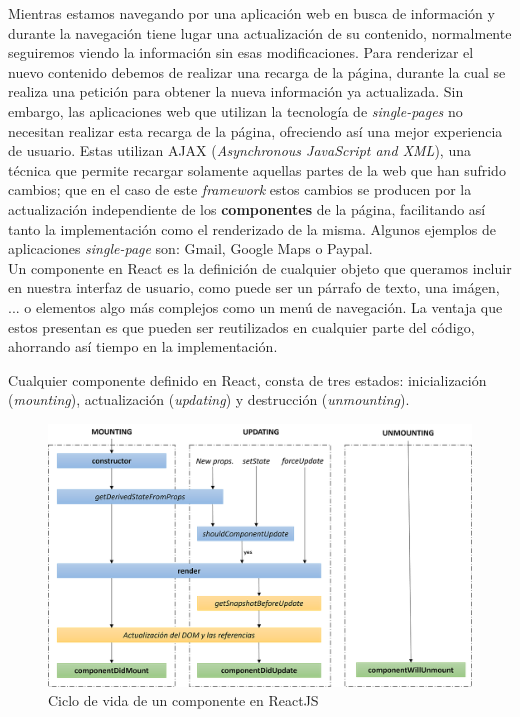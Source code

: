 \documentclass[../main.tex]{subfiles}
\begin{document}
    Mientras estamos navegando por una aplicación web en busca de información y durante la navegación tiene lugar una actualización de su contenido, normalmente seguiremos viendo la información sin esas modificaciones. Para renderizar el nuevo contenido debemos de realizar una recarga de la página, durante la cual se realiza una petición para obtener la nueva información ya actualizada. Sin embargo, las aplicaciones web que utilizan la tecnología de \textit{single-pages} no necesitan realizar esta recarga de la página, ofreciendo así una mejor experiencia de usuario. Estas utilizan AJAX (\textit{Asynchronous JavaScript and XML}), una técnica que permite recargar solamente aquellas partes de la web que han sufrido cambios; que en el caso de este \textit{framework} estos cambios se producen por la actualización independiente de los \textbf{componentes} de la página, facilitando así tanto la implementación como el renderizado de la misma. Algunos ejemplos de aplicaciones \textit{single-page} son: Gmail, Google Maps o Paypal. \\
    
    Un componente en React es la definición de cualquier objeto que queramos incluir en nuestra interfaz de usuario, como puede ser un párrafo de texto, una imágen, ... o elementos algo más complejos como un menú de navegación. La ventaja que estos presentan es que pueden ser reutilizados en cualquier parte del código, ahorrando así tiempo en la implementación. 
    
    Cualquier componente definido en React, consta de tres estados: inicialización (\textit{mounting}), actualización (\textit{updating}) y destrucción (\textit{unmounting}).
    
    \begin{figure}[!h]
        \centering
        \includegraphics[width=\textwidth]{images/react_component_lifecycle.png}
        \caption{Ciclo de vida de un componente en ReactJS \cite{reactComponent}}
        \label{fig::react_component_lifecycles}
    \end{figure}
    
\end{document}
